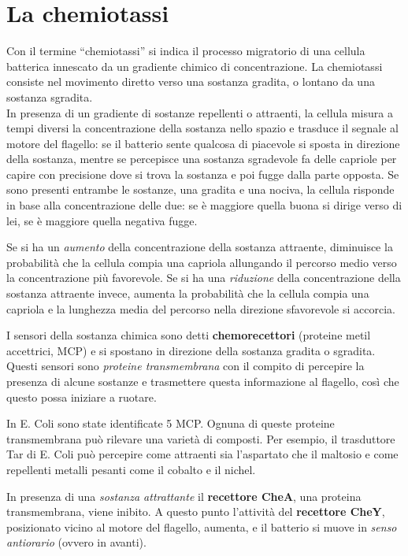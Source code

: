 \documentclass[11pt]{book}
\begin{document}
\section{La chemiotassi}
Con il termine ``chemiotassi'' si indica il processo migratorio di una cellula batterica innescato da un gradiente chimico di concentrazione.
La chemiotassi consiste nel movimento diretto verso una sostanza gradita, o lontano da una sostanza sgradita.\\
In presenza di un gradiente di sostanze repellenti o attraenti, la cellula misura a tempi diversi la concentrazione della sostanza nello spazio e trasduce il segnale al motore del flagello: se il batterio sente qualcosa di piacevole si sposta in direzione della sostanza, mentre se percepisce una sostanza sgradevole fa delle capriole per capire con precisione dove si trova la sostanza e poi fugge dalla parte opposta.
Se sono presenti entrambe le sostanze, una gradita e una nociva, la cellula risponde in base alla concentrazione delle due: se è maggiore quella buona si dirige verso di lei, se è maggiore quella negativa fugge.

Se si ha un \emph{aumento} della concentrazione della sostanza attraente, diminuisce la probabilità che la cellula compia una capriola allungando il percorso medio verso la concentrazione più favorevole.
Se si ha una \emph{riduzione} della concentrazione della sostanza attraente invece, aumenta la probabilità che la cellula compia una capriola e la lunghezza media del percorso nella direzione sfavorevole si accorcia.

\vspace{1em}
I sensori della sostanza chimica sono detti \textbf{chemorecettori} (proteine metil accettrici, MCP) e si spostano in direzione della sostanza gradita o sgradita.
Questi sensori sono \emph{proteine transmembrana} con il compito di percepire la presenza di alcune sostanze e trasmettere questa informazione al flagello, così che questo possa iniziare a ruotare.

In E. Coli sono state identificate 5 MCP. Ognuna di queste proteine transmembrana può rilevare una varietà di composti. Per esempio, il trasduttore Tar di E. Coli può percepire come attraenti sia l'aspartato che il maltosio e come repellenti metalli pesanti come il cobalto e il nichel.

\vspace{1em}
In presenza di una \emph{sostanza attrattante} il \textbf{recettore CheA}, una proteina transmembrana, viene inibito. A questo punto l'attività del \textbf{recettore CheY}, posizionato vicino al motore del flagello, aumenta, e il batterio si muove in \emph{senso antiorario} (ovvero in avanti).
\end{document}
